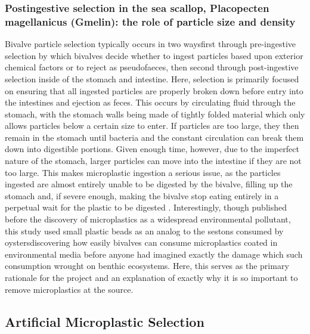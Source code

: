 \documentclass[fleqn,10pt]{SelfArx} %
\begin{document}
	\subsubsection*{Postingestive selection in the sea scallop, Placopecten magellanicus (Gmelin): the role of particle size and density}
	Bivalve particle selection typically occurs in two ways\textemdash first through pre-ingestive selection by which bivalves decide whether to ingest particles based upon exterior chemical factors or to reject as pseudofaeces, then second through post-ingestive selection inside of the stomach and intestine. Here, selection is primarily focused on ensuring that all ingested particles are properly broken down before entry into the intestines and ejection as feces. This occurs by circulating fluid through the stomach, with the stomach walls being made of tightly folded material which only allows particles below a certain size to enter. If particles are too large, they then remain in the stomach until bacteria and the constant circulation can break them down into digestible portions. Given enough time, however, due to the imperfect nature of the stomach, larger particles can move into the intestine if they are not too large. This makes microplastic ingestion a serious issue, as the particles ingested are almost entirely unable to be digested by the bivalve, filling up the stomach and, if severe enough, making the bivalve stop eating entirely in a perpetual wait for the plastic to be digested \cite{Brillant_MacDonald_2000}.
	\linebreak
	Interestingly, though published before the discovery of microplastics as a widespread environmental pollutant, this study used small plastic beads as an analog to the sestons consumed by oysters\textemdash discovering how easily bivalves can consume microplastics coated in environmental media before anyone had imagined exactly the damage which such consumption wrought on benthic ecosystems. Here, this serves as the primary rationale for the project and an explanation of exactly why it is so important to remove microplastics at the source.
	
	\subsection{Artificial Microplastic Selection}
\end{document}
